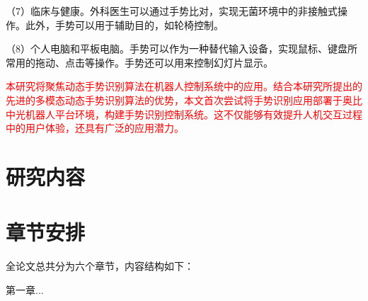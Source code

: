 （7）临床与健康。外科医生可以通过手势比对，实现无菌环境中的非接触式操作\cite{strickland2013using}。此外，手势可以用于辅助目的，如轮椅控制\cite{zeng2012natural}。

（8）个人电脑和平板电脑。手势可以作为一种替代输入设备，实现鼠标、键盘所常用的拖动、点击等操作。手势还可以用来控制幻灯片显示\cite{starner1998real}。

\textcolor{red}{本研究将聚焦动态手势识别算法在机器人控制系统中的应用。结合本研究所提出的先进的多模态动态手势识别算法的优势，本文首次尝试将手势识别应用部署于奥比中光机器人平台环境，构建手势识别控制系统。这不仅能够有效提升人机交互过程中的用户体验，还具有广泛的应用潜力。}



\section{研究内容}



\section{章节安排}

全论文总共分为六个章节，内容结构如下：

第一章...

